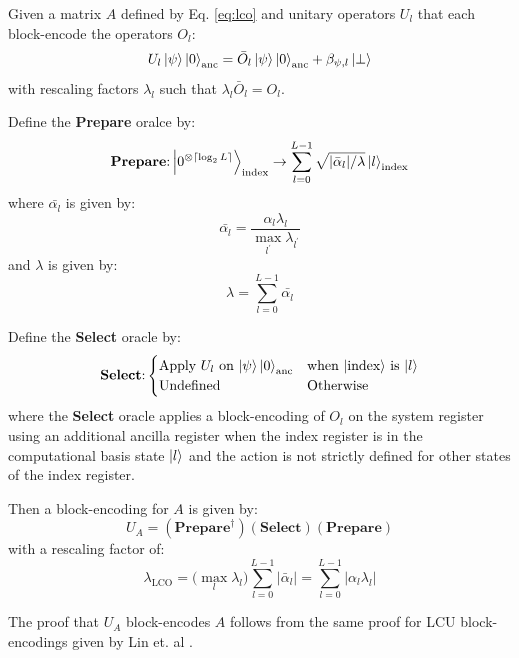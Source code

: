 \begin{theorem}
    \label{th:lco}
    Given a matrix $A$ defined by Eq. \ref{eq:lco} and unitary operators $U_l$ that each block-encode the operators $O_l$:
    \begin{equation}
        \label{eq:applying-operator}
        U_l \ket{\psi}\ket{0}_\text{anc} = \bar{O}_l \ket{\psi} \ket{0}_\text{anc} + \beta_{\psi, l} \ket{\perp}
    \end{equation}
    with rescaling factors $\lambda_l$ such that $\lambda_l \bar{O}_l = O_l$.
    
    Define the \textbf{Prepare} oralce by:
    \begin{equation}
        \label{eq:prep-lco}
        \textbf{Prepare}\text{:} \ket{0^{\otimes \lceil \log_2 L \rceil}}_\text{index} \rightarrow \sum_{l=0}^{L-1} \sqrt{| \bar{\alpha}_l | / \lambda} \ket{l}_\text{index}
    \end{equation}
    where $\bar{\alpha_l}$ is given by:
    \begin{equation}
        \label{eq:rescaled-coeffs}
        \bar{\alpha_l} = \frac{\alpha_l \lambda_l}{\max_{l^\prime}{\lambda_{l^\prime}}}
    \end{equation}
    and $\lambda$ is given by:
    \begin{equation}
        \lambda = \sum_{l=0}^{L-1} \bar{\alpha_l}
    \end{equation}

    Define the \textbf{Select} oracle by:
    \begin{equation}
        \label{eq:select-conditions-lco}
        \textbf{Select}\text{:} 
        \begin{cases} 
            \text{Apply $U_l$ on $\ket{\psi}\ket{0}_\text{anc}$} & \text{when $\ket{\text{index}}$ is $\ket{l}$} \\
            \text{Undefined} & \text{Otherwise} \\
        \end{cases}
    \end{equation}
    where the \textbf{Select} oracle applies a block-encoding of $O_l$ on the system register using an additional ancilla register when the index register is in the computational basis state $\ket{l}$ and the action is not strictly defined for other states of the index register.

    Then a block-encoding for $A$ is given by:
    \begin{equation}
        \label{eq:lco-be}
        U_A = (\textbf{Prepare}^\dagger) (\textbf{Select}) (\textbf{Prepare})
    \end{equation}
    with a rescaling factor of:
    \begin{equation}
        \lambda_\text{LCO} = \big(\max_{l}{\lambda_l}\big) \sum_{l=0}^{L-1} | \bar{\alpha}_l | = \sum_{l=0}^{L-1} |\alpha_l \lambda_l|
    \end{equation}
\end{theorem}
The proof that $U_A$ block-encodes $A$ follows from the same proof for LCU block-encodings given by Lin et. al \cite{lin2022lecture}.


